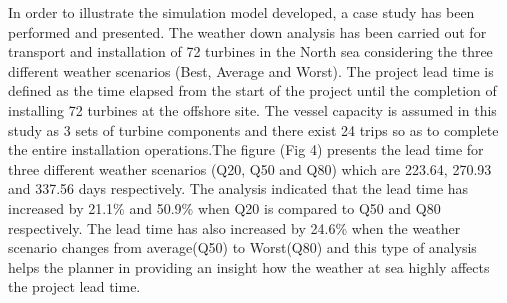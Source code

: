 In order to illustrate the simulation model developed, a case study has been performed and presented. The weather down analysis has been carried out for transport and installation of 72 turbines in the North sea considering the three different weather scenarios (Best, Average and Worst). The project lead time is defined as the time elapsed from the start of the project until the completion of installing 72 turbines at the offshore site. The vessel capacity is assumed in this study as 3 sets of turbine components and there exist 24 trips so as to complete the entire installation operations.The figure (Fig 4) presents the lead time for three different weather scenarios (Q20, Q50 and Q80) which are 223.64, 270.93 and 337.56 days respectively. The analysis indicated that the lead time has increased by 21.1\% and 50.9\% when Q20 is compared to Q50 and Q80 respectively. The lead time has also increased by 24.6\% when the weather scenario changes from average(Q50) to Worst(Q80) and this type of analysis helps the planner in providing an insight how the weather at sea highly affects the project lead time. 

